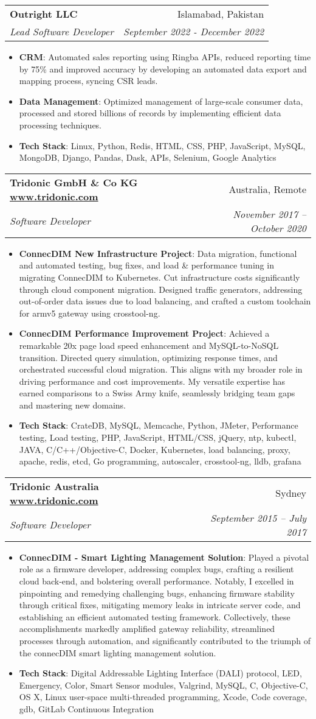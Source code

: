 \documentclass[letterpaper,10.8pt]{article}
\makeatletter
\newcommand{\resumeItem}[2]{
  \item\small{
    \textbf{#1}{: #2 \vspace{-2pt}}
  }
}
\newcommand{\resumeSubheading}[4]{
  \vspace{-1pt}\item
    \begin{tabular*}{0.97\textwidth}{l@{\extracolsep{\fill}}r}
      \textbf{#1} & #2 \\
      \textit{\small#3} & \textit{\small #4} \\
    \end{tabular*}\vspace{-5pt}
}
\newcommand{\resumeItemListStart}{\begin{itemize}}
\newcommand{\resumeItemListEnd}{\end{itemize}\vspace{-5pt}}
\makeatother
\begin{document}
    \resumeSubheading
    {Outright LLC}{Islamabad, Pakistan}
    {Lead Software Developer }{September 2022 - December 2022}
    \resumeItemListStart
        \resumeItem{CRM}
          {Automated sales reporting using Ringba APIs, reduced reporting time by 75\% and improved accuracy by developing an automated data export and mapping process, syncing CSR leads.}
          \resumeItem{Data Management}
          {Optimized management of large-scale consumer data, processed and stored billions of records by implementing efficient data processing techniques.}
        \resumeItem{Tech Stack}{Linux, Python, Redis, HTML, CSS, PHP, JavaScript, MySQL, MongoDB, Django, Pandas, Dask, APIs,
	Selenium, Google Analytics}
      \resumeItemListEnd

    \resumeSubheading
    {Tridonic GmbH \& Co KG \href{www.tridonic.com}{www.tridonic.com}}{Australia, Remote}
    {Software Developer}{November 2017 – October 2020}
    \resumeItemListStart
        \resumeItem{ConnecDIM New Infrastructure Project}
          {Data migration, functional and automated testing, bug fixes, and load \& performance tuning in migrating ConnecDIM to Kubernetes. Cut infrastructure costs significantly through cloud component migration. Designed traffic generators, addressing out-of-order data issues due to load balancing, and crafted a custom toolchain for armv5 gateway using crosstool-ng.}
        \resumeItem{ConnecDIM Performance Improvement Project}{Achieved a remarkable 20x page load speed enhancement and MySQL-to-NoSQL transition. Directed query simulation, optimizing response times, and orchestrated successful cloud migration. This aligns with my broader role in driving performance and cost improvements. My versatile expertise has earned comparisons to a Swiss Army knife, seamlessly bridging team gaps and mastering new domains.}
        \resumeItem{Tech Stack}{CrateDB, MySQL, Memcache, Python, JMeter, Performance testing, Load testing, PHP, JavaScript, HTML/CSS, jQuery, ntp, kubectl, JAVA, C/C++/Objective-C, Docker, Kubernetes, load balancing, proxy, apache, redis, etcd, Go programming, autoscaler, crosstool-ng, lldb, grafana}
      \resumeItemListEnd

    \resumeSubheading
		{Tridonic Australia \href{www.tridonic.com}{www.tridonic.com}}{Sydney}
		{Software Developer}{September 2015 – July 2017}
		\resumeItemListStart
        \resumeItem{ConnecDIM - Smart Lighting Management Solution}{Played a pivotal role as a firmware developer, addressing complex bugs, crafting a resilient cloud back-end, and bolstering overall performance. Notably, I excelled in pinpointing and remedying challenging bugs, enhancing firmware stability through critical fixes, mitigating memory leaks in intricate server code, and establishing an efficient automated testing framework. Collectively, these accomplishments markedly amplified gateway reliability, streamlined processes through automation, and significantly contributed to the triumph of the connecDIM smart lighting management solution.}
          \resumeItem{Tech Stack}{Digital Addressable Lighting Interface (DALI) protocol, LED, Emergency, Color, Smart Sensor modules, Valgrind, MySQL, C, Objective-C, OS X, Linux user-space multi-threaded programming, Xcode, Code coverage, gdb, GitLab Continuous Integration}
		\resumeItemListEnd
\end{document}
